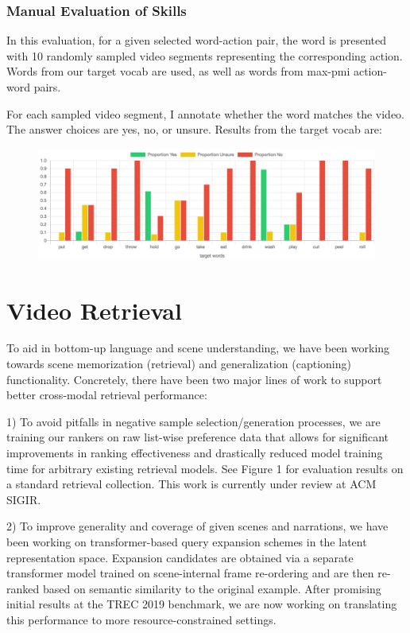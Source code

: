 \documentclass[11pt]{article}
\begin{document}
\subsubsection{Manual Evaluation of Skills}

In this evaluation, for a given selected word-action pair, the word is presented with 10 randomly sampled video segments representing the corresponding action. Words from our target vocab are used, as well as words from max-pmi action-word pairs.

For each sampled video segment, I annotate whether the word matches the video. The answer choices are yes, no, or unsure. Results from the target vocab are:

\begin{figure}
\includegraphics[width=\linewidth]{figures/human_eval}
\end{figure}

\section{Video Retrieval} 
\label{sec:ir}

To aid in bottom-up language and scene understanding, we have been working towards scene memorization (retrieval) and generalization (captioning) functionality. Concretely, there have been two major lines of work to support better cross-modal retrieval performance: 

1) To avoid pitfalls in negative sample selection/generation processes, we are training our rankers on raw list-wise preference data that allows for significant improvements in ranking effectiveness and drastically reduced model training time for arbitrary existing retrieval models. See Figure 1 for evaluation results on a standard retrieval collection. This work is currently under review at ACM SIGIR.

2) To improve generality and coverage of given scenes and narrations, we have been working on transformer-based query expansion schemes in the latent representation space. Expansion candidates are obtained via a separate transformer model trained on scene-internal frame re-ordering and are then re-ranked based on semantic similarity to the original example. After promising initial results at the TREC 2019 benchmark, we are now working on translating this performance to more resource-constrained settings.
\end{document}
